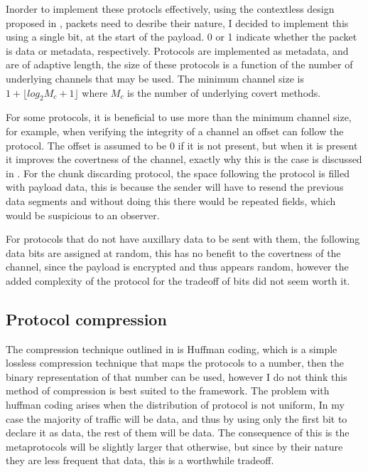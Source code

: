 Inorder to implement these protocls effectively, using the contextless design proposed in , packets need to desribe their nature, I decided to implement this using a single bit, at the start of the payload. 0 or 1 indicate whether the packet is data or metadata, respectively. Protocols are implemented as metadata, and are of adaptive length, the size of these protocols is a function of the number of underlying channels that may be used. The minimum channel size is $1 + \lfloor log_2{M_c + 1} \rfloor$ where $M_c$ is the number of underlying covert methods.

For some protocols, it is beneficial to use more than the minimum channel size, for example, when verifying the integrity of a channel an offset can follow the protocol. The offset is assumed to be 0 if it is not present, but when it is present it improves the covertness of the channel, exactly why this is the case is discussed in . For the chunk discarding protocol, the space following the protocol is filled with payload data, this is because the sender will have to resend the previous data segments and without doing this there would be repeated fields, which would be suspicious to an observer.

For protocols that do not have auxillary data to be sent with them, the following data bits are assigned at random, this has no benefit to the covertness of the channel, since the payload is encrypted and thus appears random, however the added complexity of the protocol for the tradeoff of bits did not seem worth it.


\subsection{Protocol compression}

The compression technique outlined in  is Huffman coding, which is a simple lossless compression technique that maps the protocols to a number, then the binary representation of that number can be used, however I do not think this method of compression is best suited to the framework. The problem with huffman coding arises when the distribution of protocol is not uniform, In my case the majority of traffic will be data, and thus by using only the first bit to declare it as data, the rest of them will be data. The consequence of this is the metaprotocols will be slightly larger that otherwise, but since by their nature they are less frequent that data, this is a worthwhile tradeoff.

